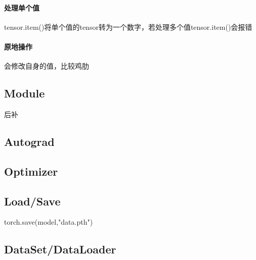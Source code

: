 \documentclass[UTF8]{ctexart}
\begin{document}
\paragraph{处理单个值}tensor.item()将单个值的tensor转为一个数字，若处理多个值tensor.item()会报错

\paragraph{原地操作}会修改自身的值，比较鸡肋
\subsection{Module}
后补
\subsection{Autograd}

\subsection{Optimizer}
\subsection{Load/Save}
torch.save(model,"data.pth")

\subsection{DataSet/DataLoader}
\end{document}
